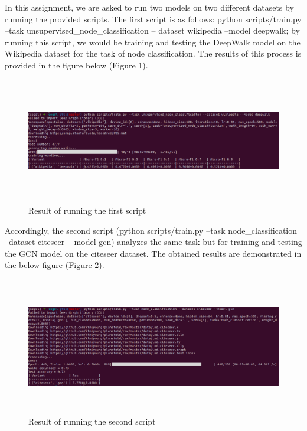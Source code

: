 \documentclass[12pt,a4paper]{article}
\begin{document}
	\noindent In this assignment, we are asked to run two models on two different datasets by running the provided scripts. The first script is as follows: python scripts/train.py --task unsupervised\_node\_classification -- dataset wikipedia --model deepwalk; by running this script, we would be training and testing the DeepWalk model on the Wikipedia dataset for the task of node classification. The results of this process is provided in the figure below (Figure 1).
	\begin{figure}[H]
		\centering
		\includegraphics[width=15cm, height=5.5cm]{Figures/cmd1}
		\vspace{-0.7cm}
		\caption{Result of running the first script}
	\end{figure}

	\vspace{-0.4cm}
	\noindent Accordingly, the second script (python scripts/train.py --task node\_classification --dataset citeseer -- model gcn) analyzes the same task but for training and testing the GCN model on the citeseer dataset. The obtained results are demonstrated in the below figure (Figure 2).
	
	\begin{figure}[H]
		\centering
		\includegraphics[width=15cm, height=6cm]{Figures/cmd2}
		\vspace{-0.7cm}
		\caption{Result of running the second script}
	\end{figure}
	
\end{document}

